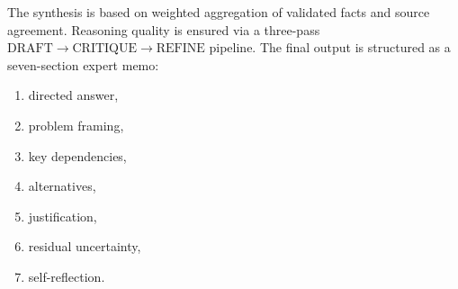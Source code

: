 The synthesis is based on weighted aggregation of validated facts and source agreement.
Reasoning quality is ensured via a three-pass $\text{DRAFT} \rightarrow \text{CRITIQUE} \rightarrow \text{REFINE}$ pipeline. The final output is structured as a seven-section expert memo:

\begin{enumerate}
    \item directed answer,
    \item problem framing,
    \item key dependencies,
    \item alternatives,
    \item justification,
    \item residual uncertainty,
    \item self-reflection.
\end{enumerate}
